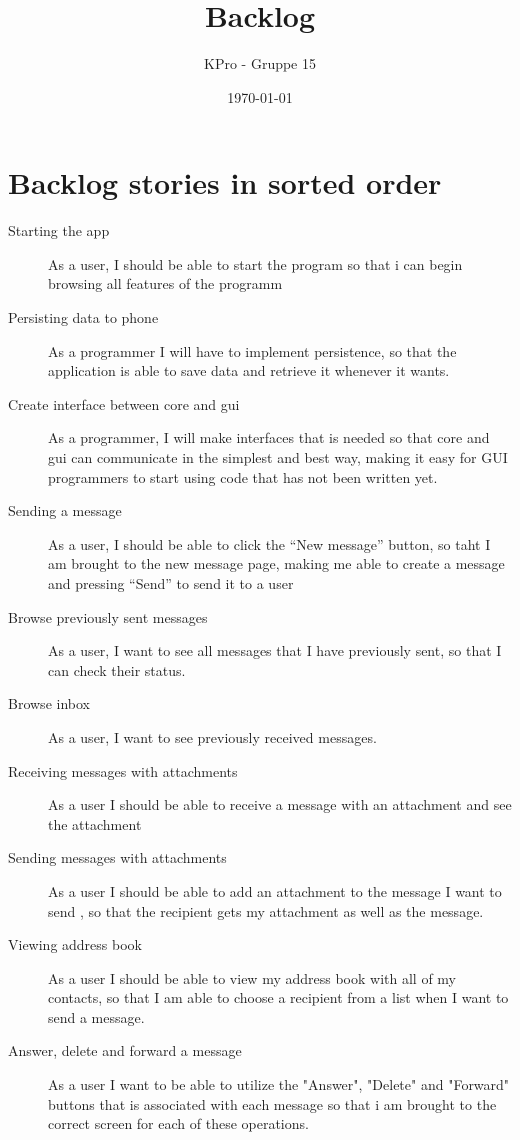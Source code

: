 \documentclass[a4paper, norsk, 12pt]{article}
\author{KPro - Gruppe 15}
\title{Backlog}
\date{\today}
\begin{document}
	\maketitle
	\pagebreak
	\section{Backlog stories in sorted order }
		\begin{description}
			\item[Starting the app] As a user, I should be able to start the program so that i can begin browsing all features of the programm
			\item[Persisting data to phone] As a programmer I will have to implement persistence, so that the application is able to save data and retrieve it whenever it wants.
			\item[Create interface between core and gui] As a programmer, I will make interfaces that is needed so that core and gui can communicate in the simplest and best way, making it easy for GUI programmers to start using code that has not been written yet.
			\item[Sending a message] As a user, I should be able to click the "`New message"' button, so taht I am brought to the new message page, making me able to create a message and pressing "`Send"' to send it to a user
			\item[Browse previously sent messages] As a user, I want to see all messages that I have previously sent, so that I can check their status.
			\item[Browse inbox] As a user, I want to see previously received messages.
			\item[Receiving messages with attachments] As a user I should be able to receive a message with an attachment and see the attachment
			\item[Sending messages with attachments] As a user I should be able to add an attachment to the message I want to send , so that the recipient gets my attachment as well as the message.
			\item[Viewing address book] As a user I should be able to view my address book with all of my contacts, so that I am able to choose a recipient from a list when I want to send a message.
			\item[Answer, delete and forward a message] As a user I want to be able to utilize the "Answer", "Delete" and "Forward" buttons that is associated with each message so that i am brought to the correct screen for each of these operations.

\end{description}
\end{document}
